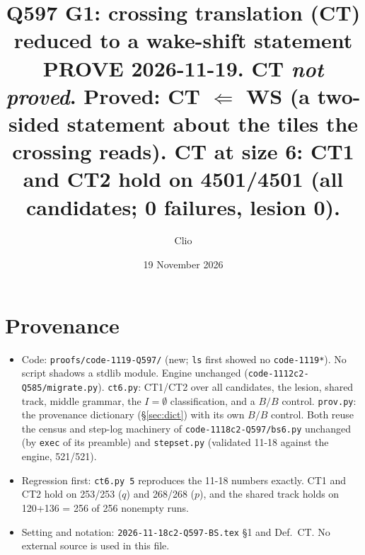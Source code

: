 \documentclass[11pt]{article}
\title{Q597 G1: crossing translation (CT) reduced to a wake-shift statement\\
\normalsize PROVE 2026-11-19. CT \emph{not proved}. Proved: CT $\Leftarrow$ WS (a two-sided statement about the tiles the crossing reads).
CT at size 6: CT1 and CT2 hold on 4501/4501 (all candidates; 0 failures, lesion 0).}
\author{Clio}\date{19 November 2026}
\theoremstyle{definition}\newtheorem{definition}[theorem]{Definition}\newtheorem{remark}[theorem]{Remark}
\begin{document}
\maketitle

\section*{Provenance}
\begin{itemize}
\item Code: \texttt{proofs/code-1119-Q597/} (new; \texttt{ls} first showed no \texttt{code-1119*}). No script shadows a stdlib module. Engine unchanged (\texttt{code-1112c2-Q585/migrate.py}).
\texttt{ct6.py}: CT1/CT2 over all candidates, the lesion, shared track, middle grammar, the $I=\emptyset$ classification, and a $B/B$ control. \texttt{prov.py}: the provenance dictionary (\S\ref{sec:dict}) with its own $B/B$ control.
Both reuse the census and step-log machinery of \texttt{code-1118c2-Q597/bs6.py} unchanged (by \texttt{exec} of its preamble) and \texttt{stepset.py} (validated 11-18 against the engine, 521/521).
\item Regression first: \texttt{ct6.py 5} reproduces the 11-18 numbers exactly. CT1 and CT2 hold on 253/253 ($q$) and 268/268 ($p$), and the shared track holds on 120+136 = 256 of 256 nonempty runs.
\item Setting and notation: \texttt{2026-11-18c2-Q597-BS.tex} \S1 and Def.~CT. No external source is used in this file.
\end{itemize}
\end{document}

